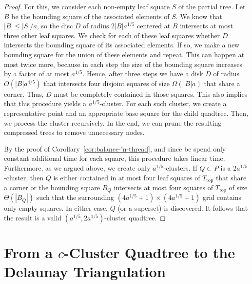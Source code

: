 \documentclass[11pt]{paper}
\begin{document}
\begin{proof}
      For this, we consider each non-empty leaf square $S$ of the partial tree.
      Let $B$ be the bounding square of the associated elements of $S$.
      We know that $|B| \leq |S|/a$, so the disc $D$ of radius  $2|B|a^{1/5}$
      centered at $B$ intersects at most three other leaf squares. 
      We check for each of these leaf squares whether $D$ intersects
      the bounding square of its associated elements.
      If so, we make a new bounding square for the union of these elements and
      repeat. This can happen at most twice more, because in each step
      the size of the bounding square increases by a factor of at most $a^{1/5}$.
      Hence, after three steps we have a disk $D$ of 
      radius $O(|B|a^{4/5})$ that 
      intersects four disjoint squares of size $\Omega(|B|a)$ that share a
      corner. Thus, $D$ must be completely contained in those squares. 
      This also implies that this procedure yields a
      $a^{1/5}$-cluster.  For each such cluster, we 
      create a representative point and
      an appropriate base square for the child quadtree. 
      Then, we process the cluster
      recursively. In the end, we can prune the resulting compressed
      trees to remove unnecessary nodes.

      By the proof of Corollary~\ref{cor:balance-'n-thread},
      and since be spend only constant additional time for each square,
      this procedure takes linear time. Furthermore, as we argued
      above, we create only $a^{1/5}$-clusters. If $Q \subset P$
      is a $2a^{1/5}$-cluster, then $Q$ is either contained in
      at most four leaf squares of $T_\text{top}$ that share a corner or
      the bounding square $B_Q$ intersects at most four squares of 
      $T_\text{top}$ of size $\Theta(|B_Q|)$ such that the
      surrounding $(4a^{1/5}+1) \times (4a^{1/5}+1)$ grid contains only  empty
      squares. In either case, $Q$ (or a superset) is discovered.
      It follows that the result is a valid $(a^{1/5},2a^{1/5})$-cluster 
      quadtree.
    \end{proof}






















\section {From a $c$-Cluster Quadtree to the Delaunay Triangulation}
\label{sec:qt->dt}
\end{document}
